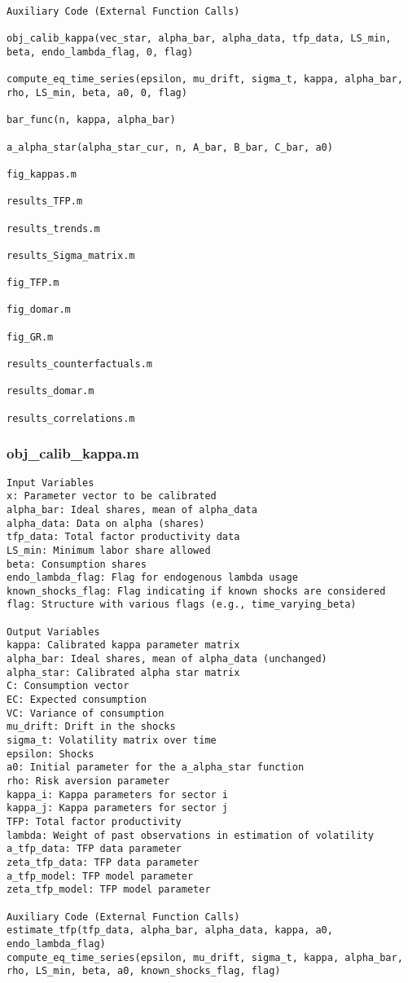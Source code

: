 \documentclass[11pt]{article}
\theoremstyle{definition}
\newcommand{\codepath}{F:/12004835/replication_package_final/replication_package_final}
\begin{document}
\begin{lstlisting}[style=Matlab]
Auxiliary Code (External Function Calls)

obj_calib_kappa(vec_star, alpha_bar, alpha_data, tfp_data, LS_min, beta, endo_lambda_flag, 0, flag)

compute_eq_time_series(epsilon, mu_drift, sigma_t, kappa, alpha_bar, rho, LS_min, beta, a0, 0, flag)

bar_func(n, kappa, alpha_bar)

a_alpha_star(alpha_star_cur, n, A_bar, B_bar, C_bar, a0)

fig_kappas.m

results_TFP.m

results_trends.m

results_Sigma_matrix.m

fig_TFP.m

fig_domar.m

fig_GR.m

results_counterfactuals.m

results_domar.m

results_correlations.m
	\end{lstlisting}
	
	
	
	
	\subsubsection{obj\_calib\_kappa.m}
	\begin{lstlisting}[style=Matlab]
Input Variables
x: Parameter vector to be calibrated
alpha_bar: Ideal shares, mean of alpha_data
alpha_data: Data on alpha (shares)
tfp_data: Total factor productivity data
LS_min: Minimum labor share allowed
beta: Consumption shares
endo_lambda_flag: Flag for endogenous lambda usage
known_shocks_flag: Flag indicating if known shocks are considered
flag: Structure with various flags (e.g., time_varying_beta)

Output Variables
kappa: Calibrated kappa parameter matrix
alpha_bar: Ideal shares, mean of alpha_data (unchanged)
alpha_star: Calibrated alpha star matrix
C: Consumption vector
EC: Expected consumption
VC: Variance of consumption
mu_drift: Drift in the shocks
sigma_t: Volatility matrix over time
epsilon: Shocks
a0: Initial parameter for the a_alpha_star function
rho: Risk aversion parameter
kappa_i: Kappa parameters for sector i
kappa_j: Kappa parameters for sector j
TFP: Total factor productivity
lambda: Weight of past observations in estimation of volatility
a_tfp_data: TFP data parameter
zeta_tfp_data: TFP data parameter
a_tfp_model: TFP model parameter
zeta_tfp_model: TFP model parameter

Auxiliary Code (External Function Calls)
estimate_tfp(tfp_data, alpha_bar, alpha_data, kappa, a0, endo_lambda_flag)
compute_eq_time_series(epsilon, mu_drift, sigma_t, kappa, alpha_bar, rho, LS_min, beta, a0, known_shocks_flag, flag)
	\end{lstlisting}
	
	
\end{document}
